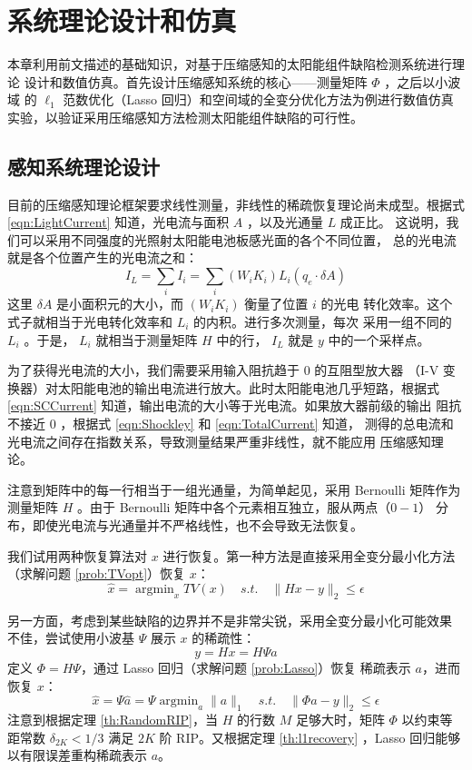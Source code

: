 \chapter{系统理论设计和仿真}

本章利用前文描述的基础知识，对基于压缩感知的太阳能组件缺陷检测系统进行理论
设计和数值仿真。首先设计压缩感知系统的核心——测量矩阵 $\Phi$ ，之后以小波域
的 $\ell_1$ 范数优化（Lasso 回归）和空间域的全变分优化方法为例进行数值仿真
实验，以验证采用压缩感知方法检测太阳能组件缺陷的可行性。

\section{感知系统理论设计}

目前的压缩感知理论框架要求线性测量，非线性的稀疏恢复理论尚未成型。根据式
\ref{eqn:LightCurrent} 知道，光电流与面积 $A$ ，以及光通量 $L$ 成正比。
这说明，我们可以采用不同强度的光照射太阳能电池板感光面的各个不同位置，
总的光电流就是各个位置产生的光电流之和：
\begin{equation}
I_L = \sum_i I_i = \sum_i (W_i K_i)  L_i(q_e \cdot \delta A)
\end{equation}
这里 $\delta A$ 是小面积元的大小，而 $(W_i K_i)$ 衡量了位置 $i$ 的光电
转化效率。这个式子就相当于光电转化效率和 $L_i$ 的内积。进行多次测量，每次
采用一组不同的 $L_i$ 。于是， $L_i$ 就相当于测量矩阵 $H$ 中的行，
$I_L$ 就是 $y$ 中的一个采样点。

为了获得光电流的大小，我们需要采用输入阻抗趋于 $0$ 的互阻型放大器 （I-V
变换器）对太阳能电池的输出电流进行放大。此时太阳能电池几乎短路，根据式
\ref{eqn:SCCurrent} 知道，输出电流的大小等于光电流。如果放大器前级的输出
阻抗不接近 $0$ ，根据式 \ref{eqn:Shockley} 和 \ref{eqn:TotalCurrent} 知道，
测得的总电流和光电流之间存在指数关系，导致测量结果严重非线性，就不能应用
压缩感知理论。

注意到矩阵中的每一行相当于一组光通量，为简单起见，采用 Bernoulli 矩阵作为
测量矩阵 $H$ 。由于 Bernoulli 矩阵中各个元素相互独立，服从两点（$0-1$）
分布，即使光电流与光通量并不严格线性，也不会导致无法恢复。

我们试用两种恢复算法对 $x$ 进行恢复。第一种方法是直接采用全变分最小化方法
（求解问题 \ref{prob:TVopt}）恢复 $x$：
\begin{equation}
\hat x = \mathop{\arg\min}_{x} TV(x) \quad s.t. \quad
\|Hx - y\|_2 \leq \epsilon
\end{equation}

另一方面，考虑到某些缺陷的边界并不是非常尖锐，采用全变分最小化可能效果
不佳，尝试使用小波基 $\Psi$ 展示 $x$ 的稀疏性：
\begin{equation}
y = Hx = H\Psi a
\end{equation}
定义 $\Phi = H\Psi$，通过 Lasso 回归（求解问题 \ref{prob:Lasso}）恢复
稀疏表示 $a$，进而恢复 $x$：
\begin{equation}
\hat x = \Psi \hat a = \Psi \mathop{\arg\min}_{a} \|a\|_1 \quad s.t.
\quad \|\Phi a - y\|_2 \leq \epsilon
\end{equation}
注意到根据定理 \ref{th:RandomRIP}，当 $H$ 的行数 $M$ 足够大时，矩阵 $\Phi$
以约束等距常数 $\delta_{2K} < 1/3$ 满足 $2K$ 阶 RIP。又根据定理
\ref{th:l1recovery} ，Lasso 回归能够以有限误差重构稀疏表示 $a$。

